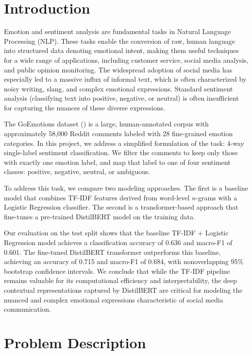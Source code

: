 \documentclass[
  conference,
  letterpaper]{IEEEtran}
\begin{document}
\section{Introduction}\label{introduction}

Emotion and sentiment analysis are fundamental tasks in Natural Language
Processing (NLP). These tasks enable the conversion of raw, human
language into structured data denoting emotional intent, making them
useful techniques for a wide range of applications, including customer
service, social media analysis, and public opinion monitoring. The
widespread adoption of social media has especially led to a massive
influx of informal text, which is often characterized by noisy writing,
slang, and complex emotional expressions. Standard sentiment analysis
(classifying text into positive, negative, or neutral) is often
insufficient for capturing the nuances of these diverse expressions.

The GoEmotions dataset
() is a
large, human-annotated corpus with approximately 58,000 Reddit comments
labeled with 28 fine-grained emotion categories. In this project, we
address a simplified formulation of the task: 4-way single-label
sentiment classification. We filter the comments to keep only those with
exactly one emotion label, and map that label to one of four sentiment
classes: positive, negative, neutral, or ambiguous.

To address this task, we compare two modeling approaches. The first is a
baseline model that combines TF-IDF features derived from word-level
\(n\)-grams with a Logistic Regression classifier. The second is a
transformer-based approach that fine-tunes a pre-trained DistilBERT
model on the training data.

Our evaluation on the test split shows that the baseline TF-IDF +
Logistic Regression model achieves a classification accuracy of 0.636
and macro-F1 of 0.601. The fine-tuned DistilBERT transformer outperforms
this baseline, achieving an accuracy of 0.715 and macro-F1 of 0.684,
with nonoverlapping 95\% bootstrap confidence intervals. We conclude
that while the TF-IDF pipeline remains valuable for its computational
efficiency and interpretability, the deep contextual representations
captured by DistilBERT are critical for modeling the nuanced and complex
emotional expressions characteristic of social media communication.

\section{Problem Description}\label{problem-description}
\end{document}
